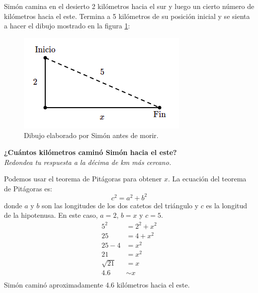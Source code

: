 Simón camina en el desierto 2 kilómetros hacia el sur y luego un cierto número de kilómetros hacia el este.
Termina a 5 kilómetros de su posición inicial y se sienta a hacer el dibujo mostrado en la figura \ref{fig:proverb_pitagoras_01}:
\begin{figure}[H]
    \centering
    \includegraphics[width=0.35\linewidth]{../images/proverb_pitagoras_01.png}
    \caption{Dibujo elaborado por Simón antes de morir.}
    \label{fig:proverb_pitagoras_01}
\end{figure}

\textbf{¿Cuántos kilómetros caminó Simón hacia el este?}\\
\textit{Redondea tu respuesta a la décima de km más cercano.}

\begin{solutionbox}{8cm}
    Podemos usar el teorema de Pitágoras para obtener $x$.
    La ecuación del teorema de Pitágoras es:
    \[c^2=a^2+b^2\]
    donde $a$ y $b$ son las longitudes de los dos catetos del triángulo y $c$ es la longitud de la hipotenusa.
    En este caso, $a=2$, $b=x$ y $c=5$.
    \begin{align*}
        5^2       & =2^2+x^2  \\
        25        & = 4 + x^2 \\
        25-4      & =x^2      \\
        21        & =x^2      \\
        \sqrt{21} & =x        \\
        4.6       & \sim x    \\
    \end{align*}
    Simón caminó aproximadamente 4.6 kilómetros hacia el este.
\end{solutionbox}